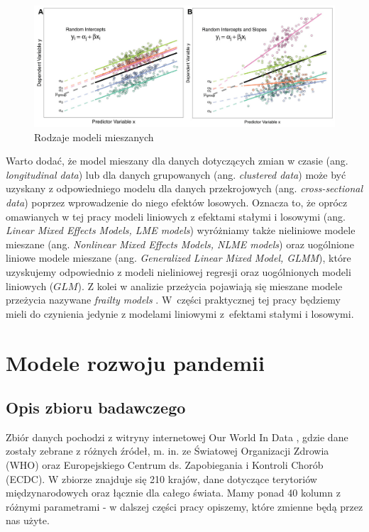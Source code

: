 \documentclass[12pt]{mwbk}
\theoremstyle{plain}
\theoremstyle{definition}
\theoremstyle{definition}
\newcommand\zrodlo[1]{\par\vspace{-3mm}{\small\textit{Źródło: }#1 }}
\begin{document}
 
 \begin{figure}[!ht]
 	\centering
 	\includegraphics[width=\linewidth]{rys/random_types.jpg}
 	\caption{Rodzaje modeli mieszanych}
 	\label{fig:random_types}
 	\zrodlo{\cite{brief}}
 \end{figure}

 Warto dodać, że model mieszany dla danych dotyczących zmian w czasie (ang. \textit{longitudinal data}) lub dla danych grupowanych (ang. \textit{clustered data}) może być uzyskany z odpowiedniego modelu dla danych przekrojowych (ang. \textit{cross-sectional data}) poprzez wprowadzenie do niego efektów losowych. Oznacza to, że oprócz omawianych w tej pracy modeli liniowych z efektami stałymi i losowymi (ang. \textit{Linear Mixed Effects Models, LME models}) wyróżniamy także nieliniowe modele mieszane (ang. \textit{Nonlinear Mixed Effects Models, NLME models}) oraz uogólnione liniowe modele mieszane (ang. \textit{Generalized Linear Mixed Model, GLMM}), które uzyskujemy odpowiednio z modeli nieliniowej regresji oraz uogólnionych modeli liniowych ($GLM$). Z kolei w analizie przeżycia pojawiają się mieszane modele przeżycia nazywane \textit{frailty models} \cite{insurance}. W~części praktycznej tej pracy będziemy mieli do czynienia jedynie z modelami liniowymi z~efektami stałymi i losowymi.
 
\chapter{Modele rozwoju pandemii}
\section{Opis zbioru badawczego}

Zbiór danych pochodzi z witryny internetowej Our World In Data \cite{owid}, gdzie dane zostały zebrane z różnych źródeł, m. in. ze Światowej Organizacji Zdrowia (WHO) oraz Europejskiego Centrum ds. Zapobiegania i Kontroli Chorób (ECDC). W zbiorze znajduje się 210 krajów, dane dotyczące terytoriów międzynarodowych oraz łącznie dla całego świata. Mamy ponad 40 kolumn z różnymi parametrami - w dalszej części pracy opiszemy, które zmienne będą przez nas użyte.
\end{document}
